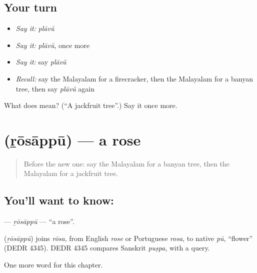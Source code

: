 \subsection*{Your turn}
\begin{itemize}
\raggedright
  \item \emph{Say it:} \emph{plāvŭ}
  \item \emph{Say it:} \emph{plāvŭ}, once more
  \item \emph{Say it:} say \emph{plāvŭ}
  \item \emph{Recall:} say the Malayalam for a firecracker, then the Malayalam for a banyan tree, then say \emph{plāvŭ} again
\end{itemize}

\begin{tcolorbox}[breakable,colback=teal!4,colframe=teal!35!black,title={Before you move on}]
What does  mean? (\textquotedblleft{}A jackfruit tree\textquotedblright{}.) Say it once more.
\end{tcolorbox}
\section[\texorpdfstring{\ml{റോസാപ്പൂ} (ṟōsāppū)}{റോസാപ്പൂ (ṟōsāppū)}]{ (ṟōsāppū) — a rose}

\label{lesson:ML-C253-rosappu}



\begin{quote}
Before the new one: say the Malayalam for a banyan tree, then the Malayalam for a jackfruit tree.
\end{quote}

\subsection*{You'll want to know: }
\textbf{} — \emph{ṟōsāppū} — \textquotedblleft{}a rose\textquotedblright{}.

\begin{cousinweb}
\textbf{} (\emph{ṟōsāppū}) joins \emph{rōsa}, from English \emph{rose} or Portuguese \emph{rosa}, to native \emph{pū}, \textquotedblleft{}flower\textquotedblright{} (DEDR 4345). DEDR 4345 compares Sanskrit \emph{puṣpa}, with a query.
\end{cousinweb}

\begin{grammarlens}[title={What you've built}]
One more word for this chapter.
\end{grammarlens}

